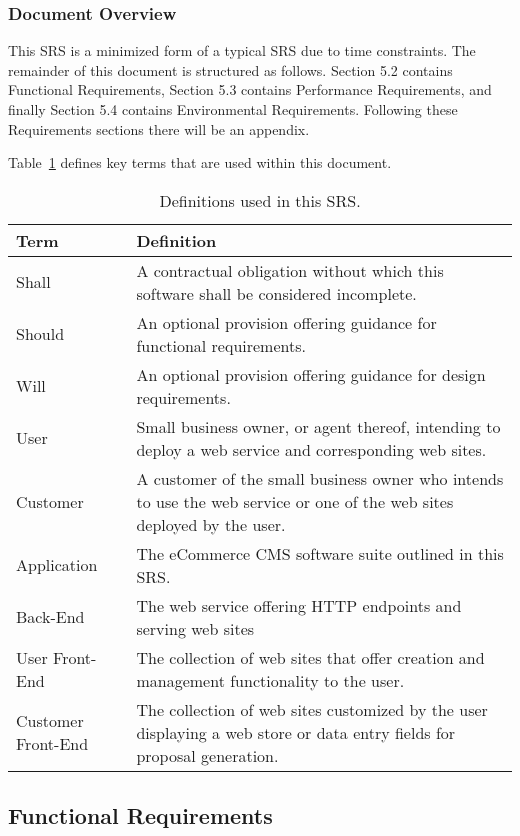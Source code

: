\documentclass{article}
\begin{document}
\subsubsection{Document Overview}

This SRS is a minimized form of a typical SRS due to time constraints.  The
remainder of this document is structured as follows.  Section 5.2 contains
Functional Requirements, Section 5.3 contains Performance Requirements, and
finally Section 5.4 contains Environmental Requirements.  Following these
Requirements sections there will be an appendix.

Table~\ref{terms} defines key terms that are used within this document.

\begin{table}
    \begin{tabular}{|l|p{11cm}|}\hline
        Term & Definition \\\hline\hline
        Shall & A contractual obligation without which this software shall be considered incomplete. \\\hline
        Should & An optional provision offering guidance for functional requirements. \\\hline
        Will & An optional provision offering guidance for design requirements. \\\hline
        User & Small business owner, or agent thereof, intending to deploy a web service
        and corresponding web sites. \\\hline
        Customer & A customer of the small business owner who intends to use the web service
        or one of the web sites deployed by the user. \\\hline
        Application & The eCommerce CMS software suite outlined in this SRS. \\\hline
        Back-End & The web service offering HTTP endpoints and serving web sites \\\hline
        User Front-End & The collection of web sites that offer creation and management
        functionality to the user. \\\hline
        Customer Front-End & The collection of web sites customized by the user displaying
        a web store or data entry fields for proposal generation.\\\hline
    \end{tabular}
    \caption{Definitions used in this SRS.}
    \label{terms}
\end{table}

\subsection{Functional Requirements}
\end{document}

